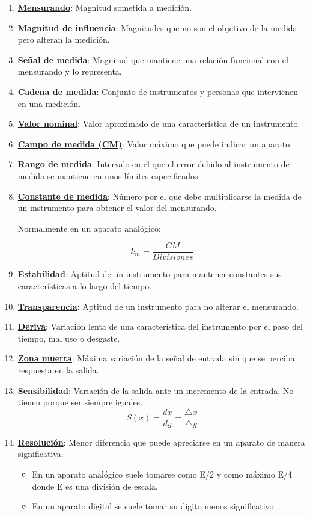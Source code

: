 \begin{enumerate}
	\item \underline{\textbf{Mensurando}}: Magnitud sometida a medición.
	\item \underline{\textbf{Magnitud de influencia}}: Magnitudes que no son el objetivo de la medida pero alteran la medición.
	\item \underline{\textbf{Señal de medida}}: Magnitud que mantiene una relación funcional con el mensurando y lo representa.
	\item \underline{\textbf{Cadena de medida}}: Conjunto de instrumentos y personas que intervienen en una medición.
	\item \underline{\textbf{Valor nominal}}: Valor aproximado de una característica de un instrumento. 
	\item \underline{\textbf{Campo de medida (CM)}}: Valor máximo que puede indicar un aparato.
	\item \underline{\textbf{Rango de medida}}: Intervalo en el que el error debido al instrumento de medida se mantiene en unos límites especificados.
	\item \underline{\textbf{Constante de medida}}: Número por el que debe multiplicarse la medida de un instrumento para obtener el valor del mensurando. 
	\begin{center} 	Normalmente en un aparato analógico:\end{center}
		\[ k_m = \frac{CM}{Divisiones} \]
	\item \underline{\textbf{Estabilidad}}: Aptitud de un instrumento para mantener constantes sus características a lo largo del tiempo.
	\item \underline{\textbf{Transparencia}}: Aptitud de un instrumento para no alterar el mensurando.
	\item \underline{\textbf{Deriva}}: Variación lenta de una característica del instrumento por el paso del tiempo, mal uso o desgaste.
	\item \underline{\textbf{Zona muerta}}: Máxima variación de la señal de entrada sin que se perciba respuesta en la salida.
	\item \underline{\textbf{Sensibilidad}}: Variación de la salida ante un incremento de la entrada. No tienen porque ser siempre iguales.
	\[ S(x) = \frac{dx}{dy}=\frac{\bigtriangleup x}{\bigtriangleup y} \]
	\item \underline{\textbf{Resolución}}: Menor diferencia que puede apreciarse en un aparato de manera significativa.
	\begin{itemize}
	 \item En un aparato analógico suele tomarse como E/2 y como máximo E/4 donde E es una división de escala.
	 \item En un aparato digital se suele tomar su dígito menos significativo.
	\end{itemize}
	

\end{enumerate}
